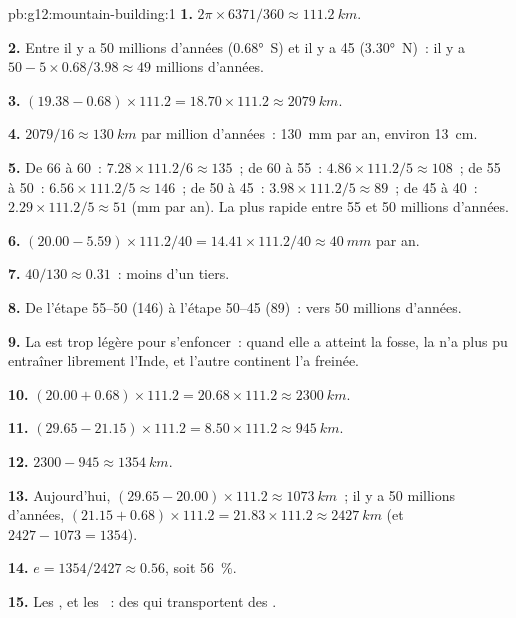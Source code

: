 \begin{solution}{pb:g12:mountain-building:1}
\textbf{1.} $2\pi \times 6371/360 \approx \qty{111.2}{km}$.

\textbf{2.} Entre il y a 50 millions d'années (\ang{0.68}~S) et il y a 45
(\ang{3.30}~N)~: il y a $50 - 5 \times 0.68/3.98 \approx 49$ millions
d'années.

\textbf{3.} $(19.38 - 0.68) \times 111.2 = 18.70 \times 111.2 \approx
\qty{2079}{km}$.

\textbf{4.} $2079/16 \approx \qty{130}{km}$ par million d'années~:
\qty{130}{mm} par an, environ \qty{13}{cm}.

\textbf{5.} De 66 à 60~: $7.28 \times 111.2/6 \approx 135$~; de 60 à 55~: $4.86
\times 111.2/5 \approx 108$~; de 55 à 50~: $6.56 \times 111.2/5 \approx 146$~; de 50
à 45~: $3.98 \times 111.2/5 \approx 89$~; de 45 à 40~: $2.29 \times 111.2/5
\approx 51$ (\unit{mm} par an). La plus rapide entre 55 et 50 millions
d'années.

\textbf{6.} $(20.00 - 5.59) \times 111.2/40 = 14.41 \times 111.2/40 \approx
\qty{40}{mm}$ par an.

\textbf{7.} $40/130 \approx 0.31$~: moins d'un tiers.

\textbf{8.} De l'étape 55--50 (146) à l'étape 50--45 (89)~: vers 50
millions d'années.

\textbf{9.} La  est trop légère pour s'enfoncer~: quand
elle a atteint la fosse, la  n'a plus pu entraîner librement
l'Inde, et l'autre continent l'a freinée.

\textbf{10.} $(20.00 + 0.68) \times 111.2 = 20.68 \times 111.2 \approx
\qty{2300}{km}$.

\textbf{11.} $(29.65 - 21.15) \times 111.2 = 8.50 \times 111.2 \approx
\qty{945}{km}$.

\textbf{12.} $2300 - 945 \approx \qty{1354}{km}$.

\textbf{13.} Aujourd'hui, $(29.65 - 20.00) \times 111.2 \approx \qty{1073}{km}$~;
il y a 50 millions d'années, $(21.15 + 0.68) \times 111.2 = 21.83 \times 111.2
\approx \qty{2427}{km}$ (et $2427 - 1073 = 1354$).

\textbf{14.} $e = 1354/2427 \approx 0.56$, soit \qty{56}{\percent}.

\textbf{15.} Les , et les ~: des  qui
transportent des .


\end{solution}
